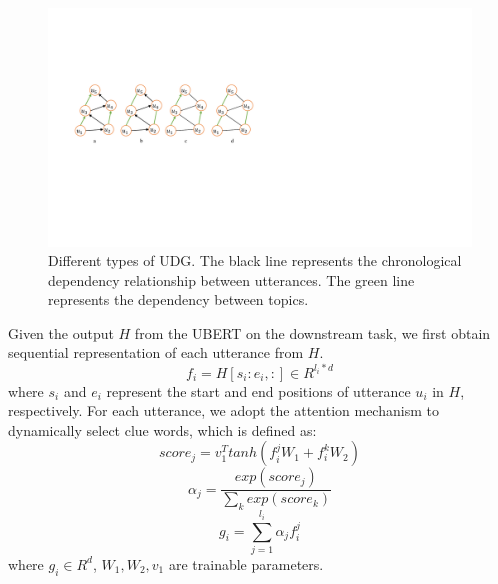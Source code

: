 \documentclass[letterpaper]{article}
\begin{document}
\begin{figure}[t]
\centering
\includegraphics[width=0.98\columnwidth]{graph}
\caption{Different types of UDG. The black line represents the chronological dependency relationship between utterances. The green line represents the dependency between topics.}
\label{dag}
\end{figure}

Given the output $H$ from the UBERT on the downstream task, we first obtain sequential representation of each utterance from $H$.
\begin{equation}
    f_i=H[s_i:e_i,:] \in R^{l_i * d}
\end{equation}
where $s_i$ and $e_i$ represent the start and end positions of utterance $u_i$ in $H$, respectively. For each utterance, we adopt the attention mechanism to dynamically select clue words, which is defined as:
\begin{equation}
    score_j=v_1^T tanh(f_i^j W_1 + f_i^k W_2)
\end{equation}
\begin{equation}
    \alpha_j=\frac{exp(score_j)}{\sum_k exp(score_k)}
\end{equation}
\begin{equation}
    g_i=\sum_{j=1}^{l_i} \alpha_j f_i^j
\end{equation}
where $g_i \in R^d$, $W_1,W_2,v_1$ are trainable parameters.
\end{document}
